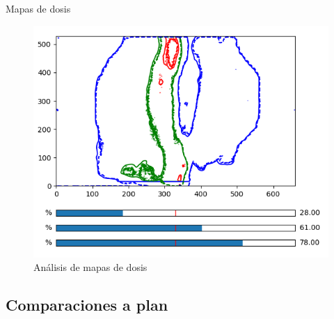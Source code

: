 \documentclass[12pt]{beamer}
\begin{document}
\begin{frame}{Mapas de dosis}
\begin{figure}[htp]
\begin{minipage}{0.45\textwidth}
	\end{minipage}\hfill
	\begin{minipage}{0.45\textwidth}
		\includegraphics[width=\textwidth]{images/curvasIsodosisMama.png}
	\end{minipage}
	\caption{Análisis de mapas de dosis}
\end{figure}
\end{frame}

\subsection{Comparaciones a plan}
\end{document}
